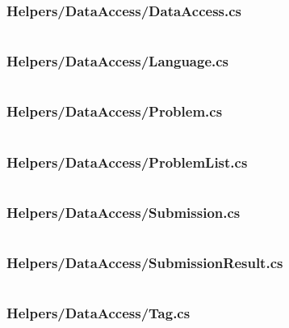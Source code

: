 \documentclass[a4paper]{report}
\begin{document}
\inputminted{csharp}{"../src/Algorithm Dynamics.Core/Helpers/DataSerialization.cs"}

\subsubsection{Helpers/DataAccess/DataAccess.cs}

\inputminted{csharp}{"../src/Algorithm Dynamics.Core/Helpers/DataAccess/DataAccess.cs"}

\subsubsection{Helpers/DataAccess/Language.cs}

\inputminted{csharp}{"../src/Algorithm Dynamics.Core/Helpers/DataAccess/Language.cs"}

\subsubsection{Helpers/DataAccess/Problem.cs}

\inputminted{csharp}{"../src/Algorithm Dynamics.Core/Helpers/DataAccess/Problem.cs"}

\subsubsection{Helpers/DataAccess/ProblemList.cs}

\inputminted{csharp}{"../src/Algorithm Dynamics.Core/Helpers/DataAccess/ProblemList.cs"}

\subsubsection{Helpers/DataAccess/Submission.cs}

\inputminted{csharp}{"../src/Algorithm Dynamics.Core/Helpers/DataAccess/Submission.cs"}

\subsubsection{Helpers/DataAccess/SubmissionResult.cs}

\inputminted{csharp}{"../src/Algorithm Dynamics.Core/Helpers/DataAccess/SubmissionResult.cs"}

\subsubsection{Helpers/DataAccess/Tag.cs}
\end{document}
